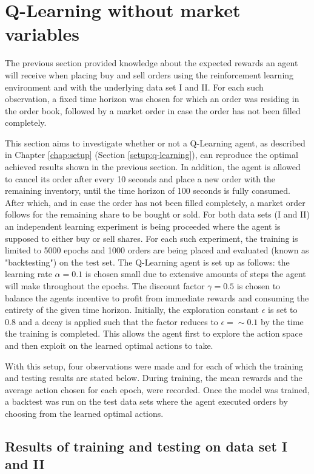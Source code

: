\section{Q-Learning without market variables}
\label{sec:eval-qlearn}
The previous section provided knowledge about the expected rewards an agent will receive when placing buy and sell orders using the reinforcement learning environment and with the underlying data set I and II.
For each such observation, a fixed time horizon was chosen for which an order was residing in the order book, followed by a market order in case the order has not been filled completely.

This section aims to investigate whether or not a Q-Learning agent, as described in Chapter \ref{chap:setup} (Section \ref{setup:q-learning}), can reproduce the optimal achieved results shown in the previous section.
In addition, the agent is allowed to cancel its order after every 10 seconds and place a new order with the remaining inventory, until the time horizon of 100 seconds is fully consumed.
After which, and in case the order has not been filled completely, a market order follows for the remaining share to be bought or sold.
For both data sets (I and II) an independent learning experiment is being proceeded where the agent is supposed to either buy or sell shares.
For each such experiment, the training is limited to 5000 epochs and 1000 orders are being placed and evaluated (known as "backtesting") on the test set.
The Q-Learning agent is set up as follows:
the learning rate $\alpha=0.1$ is chosen small due to extensive amounts of steps the agent will make throughout the epochs.
The discount factor $\gamma=0.5$ is chosen to balance the agents incentive to profit from immediate rewards and consuming the entirety of the given time horizon.
Initially, the exploration constant $\epsilon$ is set to 0.8 and a decay is applied such that the factor reduces to $\epsilon=\sim0.1$ by the time the training is completed.
This allows the agent first to explore the action space and then exploit on the learned optimal actions to take.

With this setup, four observations were made and for each of which the training and testing results are stated below.
During training, the mean rewards and the average action chosen for each epoch, were recorded.
Once the model was trained, a backtest was run on the test data sets where the agent executed orders by choosing from the learned optimal actions.

\subsection{Results of training and testing on data set I and II}

